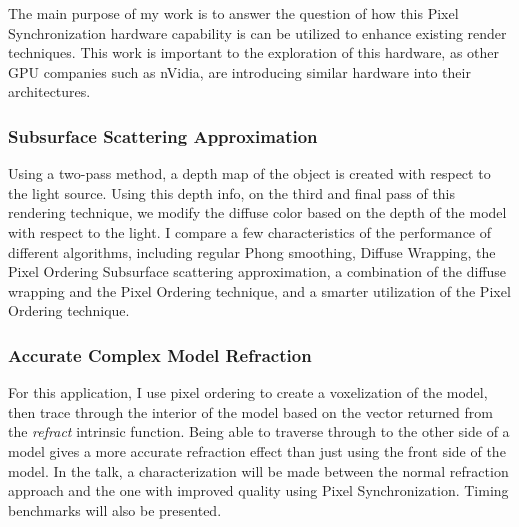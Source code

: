 \documentclass{article}
\begin{document}
\begin{multicols*}{2}
\vspace{-1ex}

The main purpose of my work is to answer the question of how this Pixel
Synchronization hardware capability is can be utilized to enhance existing
render techniques. This work is important to the exploration of this hardware,
as other GPU companies such as nVidia, are introducing similar hardware into
their architectures. \vspace{-2ex}

\subsubsection*{\textbf{Subsurface Scattering Approximation} \vspace{-1ex}}

Using a two-pass method, a depth map of the object is created with respect to
the light source. Using this depth info, on the third and final pass of this
rendering technique, we modify the diffuse color based on the depth of the
model with respect to the light. I compare a few characteristics of the
performance of different algorithms, including regular Phong smoothing,
Diffuse Wrapping\cite{GPUGems}, the Pixel Ordering Subsurface scattering
approximation, a combination of the diffuse wrapping and the Pixel Ordering
technique, and a smarter utilization of the Pixel Ordering technique.
\vspace{-2ex}

\subsubsection*{\textbf{Accurate Complex Model Refraction} \vspace{-1ex}}

For this application, I use pixel ordering to create a voxelization of
the model, then trace through the interior of the model based on the vector
returned from the \textit{refract} intrinsic function. Being able to traverse
through to the other side of a model gives a more accurate refraction
effect than just using the front side of the model. In the talk, a characterization
will be made between the normal refraction approach and the one with improved
quality using Pixel Synchronization. Timing benchmarks will also be presented.

\noindent\makebox[\linewidth]{\rule{\columnwidth}{0.4pt}}

\printbibliography[heading=none]

\end{multicols*}
\end{document}
